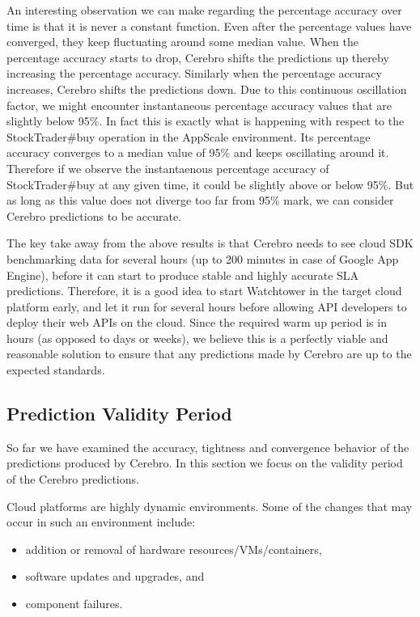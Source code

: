 An interesting observation we can make regarding the percentage accuracy over time is that it is never a constant function. 
Even after the percentage values have converged, they keep fluctuating 
around some median value. When the percentage accuracy starts to drop, Cerebro shifts the predictions up thereby increasing
the percentage accuracy. Similarly when the percentage accuracy increases, Cerebro shifts the predictions down. Due to this
continuous oscillation factor, we might encounter instantaneous percentage accuracy values that are slightly below 95\%. In fact this is exactly what is
happening with respect to the StockTrader\#buy operation in the AppScale environment. Its percentage accuracy converges to a median
value of 95\% and keeps oscillating around it. Therefore if we observe the instantaenous percentage accuracy of StockTrader\#buy at any given time, it
could be slightly above or below 95\%. But as long as this value does not diverge too far from 95\% mark, we can consider Cerebro predictions to
be accurate.

The key take away from the above results is that Cerebro needs to see cloud SDK benchmarking data for several hours (up to 200 minutes in case of 
Google App Engine), before it can start to produce stable and highly accurate SLA predictions. Therefore, it is a good idea to start Watchtower in the
target cloud platform early, and let it run for several hours before allowing API developers to deploy their web APIs on the cloud. Since the
required warm up period is in hours (as opposed to days or weeks), we believe this is a perfectly viable and reasonable solution to
ensure that any predictions made by Cerebro are up to the expected standards.

\subsection{Prediction Validity Period}
So far we have examined the accuracy, tightness and convergence behavior of the predictions produced by Cerebro. In this section we 
focus on the validity period of the Cerebro predictions.

Cloud platforms are highly dynamic environments. Some of the changes that may occur in such an environment include:
\begin{itemize}
\item addition or removal of hardware resources/VMs/containers,
\item software updates and upgrades, and
\item component failures.
\end{itemize}

